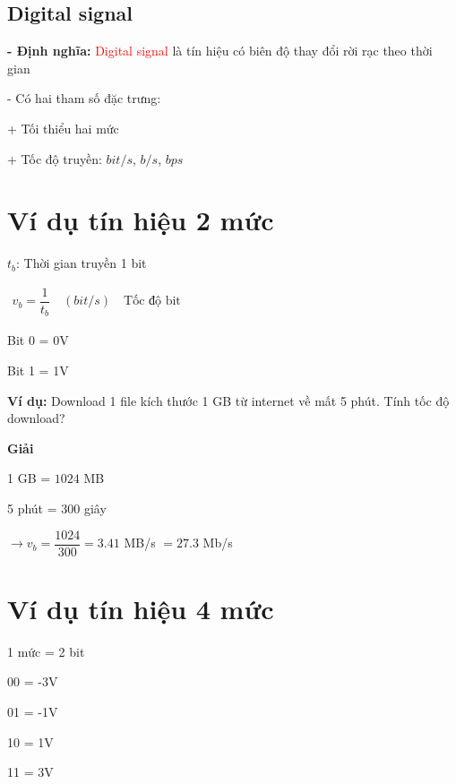 \subsection{Digital signal}
\begin{center}
    
\end{center}

\textbf{- Định nghĩa: }\textcolor{red}{Digital signal} là tín hiệu có biên độ thay đổi rời rạc theo thời gian

- Có hai tham số đặc trưng:

\hspace*{1cm}+ Tối thiểu hai mức

\hspace*{1cm}+ Tốc độ truyền: $bit/s$, $b/s$, $bps$

\section{Ví dụ tín hiệu 2 mức}
$t_b$: Thời gian truyền 1 bit

$
    \begin{aligned}
        \boxed{v_b = \dfrac{1}{t_b} \quad (bit/s)} \quad \text{Tốc độ bit}
    \end{aligned}
$

Bit 0 = 0V

Bit 1 = 1V

\noindent\textbf{Ví dụ:} Download 1 file kích thước 1 GB từ internet về mất 5 phút. Tính tốc độ download?

\begin{center}
    \textbf{Giải}
\end{center}

1 GB = $1024$ MB

5 phút = 300 giây

$\rightarrow v_b = \dfrac{1024}{300} = 3.41$ MB/s $= 27.3$ Mb/s

\section{Ví dụ tín hiệu 4 mức}
1 mức = 2 bit

\noindent\hspace*{1.5cm} 00 = -3V

\noindent\hspace*{1.5cm} 01 = -1V

\noindent\hspace*{1.5cm} 10 = 1V

\noindent\hspace*{1.5cm} 11 = 3V

